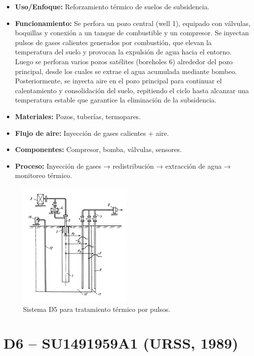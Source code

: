 \documentclass[12pt]{article}
\begin{document}
\begin{itemize}
    \item \textbf{Uso/Enfoque:} Reforzamiento térmico de suelos de subsidencia.
    \item \textbf{Funcionamiento:} Se perfora un pozo central (well 1), equipado con válvulas, boquillas y conexión a un tanque de combustible y un compresor. Se inyectan pulsos de gases calientes generados por combustión, que elevan la temperatura del suelo y provocan la expulsión de agua hacia el entorno. Luego se perforan varios pozos satélites (boreholes 6) alrededor del pozo principal, desde los cuales se extrae el agua acumulada mediante bombeo. Posteriormente, se inyecta aire en el pozo principal para continuar el calentamiento y consolidación del suelo, repitiendo el ciclo hasta alcanzar una temperatura estable que garantice la eliminación de la subsidencia.
    \item \textbf{Materiales:} Pozos, tuberías, termopares.
    \item \textbf{Flujo de aire:} Inyección de gases calientes + aire.
    \item \textbf{Componentes:} Compresor, bomba, válvulas, sensores.
    \item \textbf{Proceso:} Inyección de gases → redistribución → extracción de agua → monitoreo térmico.
\end{itemize}

\begin{figure}[H]
\centering
\includegraphics[width=0.5\textwidth]{images/d5_urss.png}
\caption{Sistema D5 para tratamiento térmico por pulsos.}
\end{figure}

\section*{ D6 – SU1491959A1 (URSS, 1989)}
\end{document}
